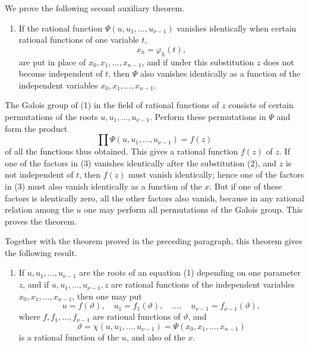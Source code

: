 \documentclass[11pt]{article}
\begin{document}
We prove the following second auxiliary theorem.

\begin{enumerate}[label=\arabic*.,start=2]
\item If the rational function \(\Psi(u,u_1,\ldots,u_{\nu-1})\) vanishes identically when certain rational functions of one variable \(t\),
\begin{equation}
x_h=\varphi_h(t),
\tag{2}
\end{equation}
are put in place of \(x_0,x_1,\ldots,x_{n-1}\), and if under this substitution \(z\) does not become independent of \(t\), then \(\Psi\) also vanishes identically as a function of the independent variables \(x_0,x_1,\ldots,x_{n-1}\).
\end{enumerate}

The Galois group of (1) in the field of rational functions of \(z\) consists of certain permutations of the roots \(u,u_1,\ldots,u_{\nu-1}\). Perform these permutations in \(\Psi\) and form the product
\begin{equation}
\prod\Psi(u,u_1,\ldots,u_{\nu-1})=f(z)
\tag{3}
\end{equation}
of all the functions thus obtained. This gives a rational function \(f(z)\) of \(z\). If one of the factors in (3) vanishes identically after the substitution (2), and \(z\) is not independent of \(t\), then \(f(z)\) must vanish identically; hence one of the factors in (3) must also vanish identically as a function of the \(x\). But if one of these factors is identically zero, all the other factors also vanish, because in any rational relation among the \(u\) one may perform all permutations of the Galois group. This proves the theorem.

Together with the theorem proved in the preceding paragraph, this theorem gives the following result.

\begin{enumerate}[label=\arabic*.,start=3]
\item If \(u,u_1,\ldots,u_{\nu-1}\) are the roots of an equation (1) depending on one parameter \(z\), and if \(u,u_1,\ldots,u_{\nu-1},z\) are rational functions of the independent variables \(x_0,x_1,\ldots,x_{n-1}\), then one may put
\begin{equation}
u=f(\vartheta),\quad u_1=f_1(\vartheta),\quad\ldots,\quad u_{\nu-1}=f_{\nu-1}(\vartheta),
\tag{4}
\end{equation}
where \(f,f_1,\ldots,f_{\nu-1}\) are rational functions of \(\vartheta\), and
\begin{equation}
\vartheta=\chi(u,u_1,\ldots,u_{\nu-1})
=\Psi(x_0,x_1,\ldots,x_{n-1})
\tag{5}
\end{equation}
is a rational function of the \(u\), and also of the \(x\).
\end{enumerate}
\end{document}
